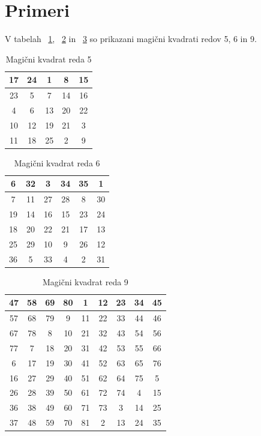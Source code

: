 \documentclass[a4paper,12pt]{article}
\theoremstyle{definition}
\theoremstyle{plain}
\newenvironment{magic}[3]
{\begin{table}[!ht]
   \centering
   \caption{#2}
   \label{#3}
   \large
   \begin{tabular}{|*{#1}{c|}}
   \hline
   }
{\end{tabular}
   \normalsize
\end{table}}
\begin{document}

\section{Primeri}

V tabelah ~\ref{table:mag5}, ~\ref{table:mag6} in ~\ref{table:mag9} so prikazani
magični kvadrati redov 5, 6 in 9. %

   
   \begin{magic}{5}{Magični kvadrat reda 5}{table:mag5}
      17 & 24 &  1 &  8 & 15 \\\hline
      23 &  5 &  7 & 14 & 16 \\\hline
       4 &  6 & 13 & 20 & 22 \\\hline
      10 & 12 & 19 & 21 &  3 \\\hline
      11 & 18 & 25 &  2 &  9 \\\hline
   \end{magic}


\begin{magic}{6}{Magični kvadrat reda 6}{table:mag6}
      6 & 32 &  3 & 34 & 35 &  1 \\\hline
      7 & 11 & 27 & 28 &  8 & 30 \\\hline
     19 & 14 & 16 & 15 & 23 & 24 \\\hline
     18 & 20 & 22 & 21 & 17 & 13 \\\hline
     25 & 29 & 10 &  9 & 26 & 12 \\\hline
     36 &  5 & 33 &  4 &  2 & 31 \\\hline
\end{magic}


\begin{magic}{9}{Magični kvadrat reda 9}{table:mag9}
      47 & 58 & 69 & 80 &  1 & 12 & 23 & 34 & 45 \\\hline
      57 & 68 & 79 &  9 & 11 & 22 & 33 & 44 & 46 \\\hline
      67 & 78 &  8 & 10 & 21 & 32 & 43 & 54 & 56 \\\hline
      77 &  7 & 18 & 20 & 31 & 42 & 53 & 55 & 66 \\\hline
       6 & 17 & 19 & 30 & 41 & 52 & 63 & 65 & 76 \\\hline
      16 & 27 & 29 & 40 & 51 & 62 & 64 & 75 &  5 \\\hline
      26 & 28 & 39 & 50 & 61 & 72 & 74 &  4 & 15 \\\hline
      36 & 38 & 49 & 60 & 71 & 73 &  3 & 14 & 25 \\\hline
      37 & 48 & 59 & 70 & 81 &  2 & 13 & 24 & 35 \\\hline
\end{magic}

\newpage




\end{document}
